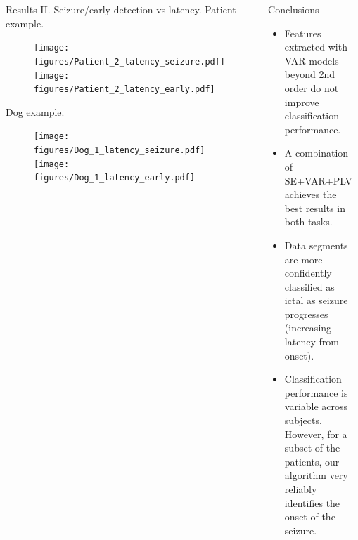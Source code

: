 \documentclass[final,t,overlay, xcolor=table, sans, mathserif]{beamer}
\begin{document}
\begin{frame}{}
\begin{columns}[t]
\begin{column}{.4\linewidth}
\vspace{-1.4cm}
\begin{columns}
\begin{block}{Results II. Seizure/early detection vs latency.}
Patient example.
\begin{figure}
\texttt{[image: figures/Patient\_2\_latency\_seizure.pdf]}
\texttt{[image: figures/Patient\_2\_latency\_early.pdf]}
\end{figure}
\vspace{-0.8cm}
Dog example.
\begin{figure}
\texttt{[image: figures/Dog\_1\_latency\_seizure.pdf]}
\texttt{[image: figures/Dog\_1\_latency\_early.pdf]}
\end{figure}
\end{block}
\begin{block}{Conclusions}
\begin{itemize}
\item Features extracted with VAR models beyond 2nd order do not improve classification performance.
\item A combination of SE+VAR+PLV achieves the best results in both tasks.
\item Data segments are more confidently classified as ictal as seizure progresses (increasing latency from onset).
\item Classification performance is variable across subjects. However, for a subset of the patients,
our algorithm very reliably identifies the onset of the seizure.
\vspace{1cm}
\end{itemize}
\end{block}

\begin{block}{References}
$[1]$ Kaggle seizure detection challenge, 2014. \\
$[2]$ Breiman, 2001 \\
$[3]$ The Fitzgerald Team solution: \\
\small www.gatsby.ucl.ac.uk/~vincenta/kaggle/report.pdf \\
\vspace{0.3cm}
\end{block}
\end{columns}



\end{column}
\end{columns}


\end{frame}
\end{document}
